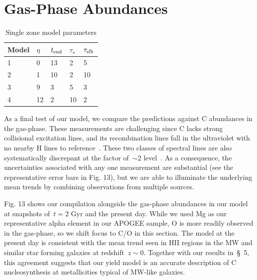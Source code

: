 \documentclass[fleqn,
usenatbib]{mnras}
\begin{document}
\section{Gas-Phase Abundances}\label{sec:gas}

\begin{table}
	\centering
    \caption[]{Single zone model parameters}
	\label{tab:singlezone_params}

	\begin{tabular}{l l l l l}
		\hline
        Model & $\eta$ & $t_{\rm end}$ & $\tau_\star$ & $\tau_{\rm sfh}$ \\
		\hline
        1 & 0 & 13 & 2 & 5\\
        2 & 1 & 10 & 2 & 10\\
        3 & 9 & 3 & 5 & 3\\
        4 & 12 & 2 & 10 & 2\\
		\hline
	\end{tabular}
\end{table}

As a final test of our model, we compare the predictions against C abundances
in the gas-phase.
These measurements are challenging since C lacks strong collisional excitation
lines, and its recombination lines fall in the ultraviolet with no nearby
H lines to reference~\citep[e.g.,][]{skillman+20}.
These two classes of spectral lines are also systematically discrepant at the
factor of~$\sim$2 level~\citep{GR07}.
As a consequence, the uncertainties associated with any one measurement are
substantial (see the representative error bars in Fig. 13), but we are able to
illuminate the underlying mean trends by combining observations from multiple
sources.
\par
Fig. 13 shows our compilation alongside the gas-phase abundances in our model
at snapshots of~$t = 2$ Gyr and the present day.
While we used Mg as our representative alpha element in our APOGEE sample, O
is more readily observed in the gas-phase, so we shift focus to C/O in this
section.
The model at the present day is consistent with the mean trend seen in HII
regions in the MW and similar star forming galaxies at redshift~$z \sim 0$.
Together with our results in~\S~5, this agreement suggests that our yield model
is an accurate description of C nucleosynthesis at metallicities typical of
MW-like galaxies.
\end{document}
